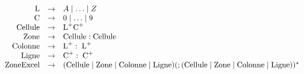 \begin{corrections}

  \begin{questions}
  \item $\begin{array}[t]{rcl}
    \text{L} &\rightarrow& A\mid \ldots \mid Z \\
    \text{C} &\rightarrow& 0 \mid \ldots \mid 9 \\
    \text{Cellule} &\rightarrow& \text{L}^+\text{C}^+ \\
    \text{Zone} &\rightarrow& \text{Cellule}:\text{Cellule} \\
    \text{Colonne} &\rightarrow&  \text{L}^+:\;\text{L}^+ \\
    \text{Ligne} &\rightarrow&  \text{C}^+:\;\text{C}^+ \\
    \text{ZoneExcel} &\rightarrow& (\text{Cellule}\mid\text{Zone}\mid\text{Colonne}\mid\text{Ligne}) (; (\text{Cellule}\mid\text{Zone}\mid\text{Colonne}\mid\text{Ligne}))^\star  \\
  \end{array}$
  \end{questions}

\end{corrections}

\endgroup
\endinput
